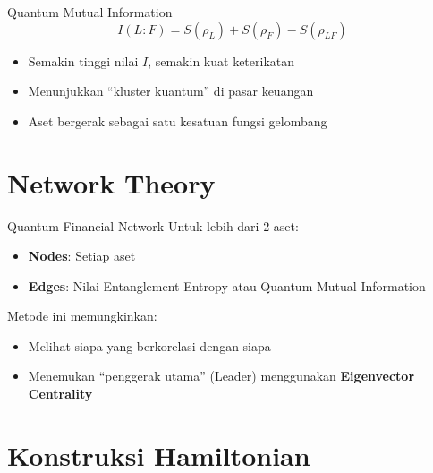 \documentclass[aspectratio=169]{beamer}
\begin{document}
\begin{frame}{Quantum Mutual Information}
    \begin{equation}
        I(L:F) = S(\rho_L) + S(\rho_F) - S(\rho_{LF})
    \end{equation}
    
    \vspace{0.5cm}
    
    \begin{itemize}
        \item Semakin tinggi nilai $I$, semakin kuat keterikatan
        \item Menunjukkan ``kluster kuantum'' di pasar keuangan
        \item Aset bergerak sebagai satu kesatuan fungsi gelombang
    \end{itemize}
\end{frame}

\section{Network Theory}

\begin{frame}{Quantum Financial Network}
    Untuk lebih dari 2 aset:
    
    \begin{itemize}
        \item \textbf{Nodes}: Setiap aset
        \item \textbf{Edges}: Nilai Entanglement Entropy atau Quantum Mutual Information
    \end{itemize}
    
    \vspace{0.5cm}
    
    Metode ini memungkinkan:
    \begin{itemize}
        \item Melihat siapa yang berkorelasi dengan siapa
        \item Menemukan ``penggerak utama'' (Leader) menggunakan \textbf{Eigenvector Centrality}
    \end{itemize}
\end{frame}

\section{Konstruksi Hamiltonian}
\end{document}
